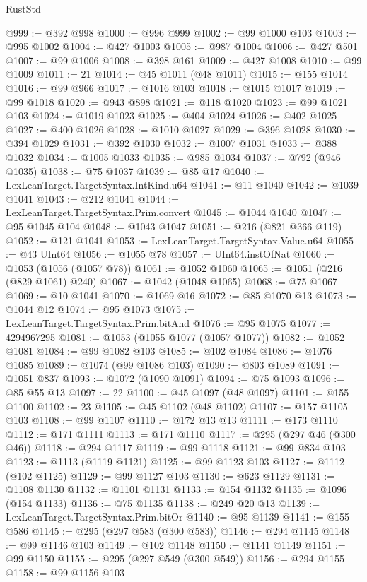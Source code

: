 \begin{lexlean}{RustStd}
\begin{coremodule}
{\begin{coremodule}
{{{{{{{{{{{{{{{{{{{{{{{{{{{{{{{{{@999 := @392 @998
@1000 := @996 @999
@1002 := @99 @1000 @103
@1003 := @995 @1002
@1004 := @427 @1003
@1005 := @987 @1004
@1006 := @427 @501
@1007 := @99 @1006
@1008 := @398 @161
@1009 := @427 @1008
@1010 := @99 @1009
@1011 := 21
@1014 := @45 @1011 (@48 @1011)
@1015 := @155 @1014
@1016 := @99 @966
@1017 := @1016 @103
@1018 := @1015 @1017
@1019 := @99 @1018
@1020 := @943 @898
@1021 := @118 @1020
@1023 := @99 @1021 @103
@1024 := @1019 @1023
@1025 := @404 @1024
@1026 := @402 @1025
@1027 := @400 @1026
@1028 := @1010 @1027
@1029 := @396 @1028
@1030 := @394 @1029
@1031 := @392 @1030
@1032 := @1007 @1031
@1033 := @388 @1032
@1034 := @1005 @1033
@1035 := @985 @1034
@1037 := @792 (@946 @1035)
@1038 := @75 @1037
@1039 := @85 @17
@1040 := LexLeanTarget.TargetSyntax.IntKind.u64
@1041 := @11 @1040
@1042 := @1039 @1041
@1043 := @212 @1041
@1044 := LexLeanTarget.TargetSyntax.Prim.convert
@1045 := @1044 @1040
@1047 := @95 @1045 @104
@1048 := @1043 @1047
@1051 := @216 (@821 @366 @119)
@1052 := @121 @1041
@1053 := LexLeanTarget.TargetSyntax.Value.u64
@1055 := @43 UInt64
@1056 := @1055 @78
@1057 := UInt64.instOfNat
@1060 := @1053 (@1056 (@1057 @78))
@1061 := @1052 @1060
@1065 := @1051 (@216 (@829 @1061) @240)
@1067 := @1042 (@1048 @1065)
@1068 := @75 @1067
@1069 := @10 @1041
@1070 := @1069 @16
@1072 := @85 @1070 @13
@1073 := @1044 @12
@1074 := @95 @1073
@1075 := LexLeanTarget.TargetSyntax.Prim.bitAnd
@1076 := @95 @1075
@1077 := 4294967295
@1081 := @1053 (@1055 @1077 (@1057 @1077))
@1082 := @1052 @1081
@1084 := @99 @1082 @103
@1085 := @102 @1084
@1086 := @1076 @1085
@1089 := @1074 (@99 @1086 @103)
@1090 := @803 @1089
@1091 := @1051 @837
@1093 := @1072 (@1090 @1091)
@1094 := @75 @1093
@1096 := @85 @55 @13
@1097 := 22
@1100 := @45 @1097 (@48 @1097)
@1101 := @155 @1100
@1102 := 23
@1105 := @45 @1102 (@48 @1102)
@1107 := @157 @1105 @103
@1108 := @99 @1107
@1110 := @172 @13 @13
@1111 := @173 @1110
@1112 := @171 @1111
@1113 := @171 @1110
@1117 := @295 (@297 @46 (@300 @46))
@1118 := @294 @1117
@1119 := @99 @1118
@1121 := @99 @834 @103
@1123 := @1113 (@1119 @1121)
@1125 := @99 @1123 @103
@1127 := @1112 (@102 @1125)
@1129 := @99 @1127 @103
@1130 := @623 @1129
@1131 := @1108 @1130
@1132 := @1101 @1131
@1133 := @154 @1132
@1135 := @1096 (@154 @1133)
@1136 := @75 @1135
@1138 := @249 @20 @13
@1139 := LexLeanTarget.TargetSyntax.Prim.bitOr
@1140 := @95 @1139
@1141 := @155 @586
@1145 := @295 (@297 @583 (@300 @583))
@1146 := @294 @1145
@1148 := @99 @1146 @103
@1149 := @102 @1148
@1150 := @1141 @1149
@1151 := @99 @1150
@1155 := @295 (@297 @549 (@300 @549))
@1156 := @294 @1155
@1158 := @99 @1156 @103
}}}}}}}}}}}}}}}}}}}}}}}}}}}}}}}}}
\end{coremodule}}
\end{coremodule}
\end{lexlean}
